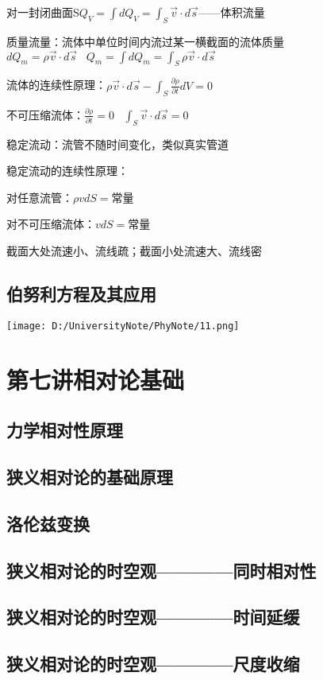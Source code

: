 \documentclass[UTF8]{article}
\begin{document}
    对一封闭曲面S$Q_V = \int dQ_V = \int_S\vec{v}\cdot d\vec{s}$——体积流量

    质量流量：流体中单位时间内流过某一横截面的流体质量$dQ_m = \rho \vec{v}\cdot d\vec{s}\;\;\;Q_m = \int dQ_m = \int_S\rho\vec{v}\cdot d\vec{s}$

    流体的连续性原理：$\rho \vec{v}\cdot d\vec{s} - \int_S\frac{\partial \rho}{\partial t}dV = 0$

    不可压缩流体：$\frac{\partial \rho}{\partial t} = 0\;\;\;\int_S\vec{v}\cdot d\vec{s} = 0$

    稳定流动：流管不随时间变化，类似真实管道

    稳定流动的连续性原理：

    \;\;对任意流管：$\rho vdS = $常量
    
    \;\;对不可压缩流体：$vdS = $常量

    截面大处流速小、流线疏；截面小处流速大、流线密

\subsection{伯努利方程及其应用}

\texttt{[image: D:/UniversityNote/PhyNote/11.png]}

\newpage
\section{第七讲\;\;相对论基础}
\subsection{力学相对性原理}
\subsection{狭义相对论的基础原理}
\subsection{洛伦兹变换}
\subsection{狭义相对论的时空观————同时相对性}
\subsection{狭义相对论的时空观————时间延缓}
\subsection{狭义相对论的时空观————尺度收缩}
\end{document}
